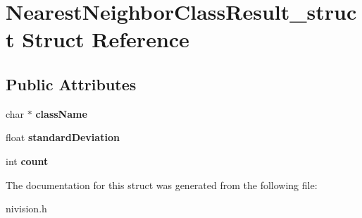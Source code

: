 \hypertarget{structNearestNeighborClassResult__struct}{
\section{NearestNeighborClassResult\_\-struct Struct Reference}
\label{structNearestNeighborClassResult__struct}
}
\subsection*{Public Attributes}
\begin{DoxyCompactItemize}
\item 
\hypertarget{structNearestNeighborClassResult__struct_a99609f31f19c205e1dede4235624527c}{
char $\ast$ {\bfseries className}}
\label{structNearestNeighborClassResult__struct_a99609f31f19c205e1dede4235624527c}

\item 
\hypertarget{structNearestNeighborClassResult__struct_a3adf2e959355eee783d76ced243311d6}{
float {\bfseries standardDeviation}}
\label{structNearestNeighborClassResult__struct_a3adf2e959355eee783d76ced243311d6}

\item 
\hypertarget{structNearestNeighborClassResult__struct_a7cbfe00730d71e78cdad9cc9fb826be8}{
int {\bfseries count}}
\label{structNearestNeighborClassResult__struct_a7cbfe00730d71e78cdad9cc9fb826be8}

\end{DoxyCompactItemize}


The documentation for this struct was generated from the following file:\begin{DoxyCompactItemize}
\item 
nivision.h\end{DoxyCompactItemize}
